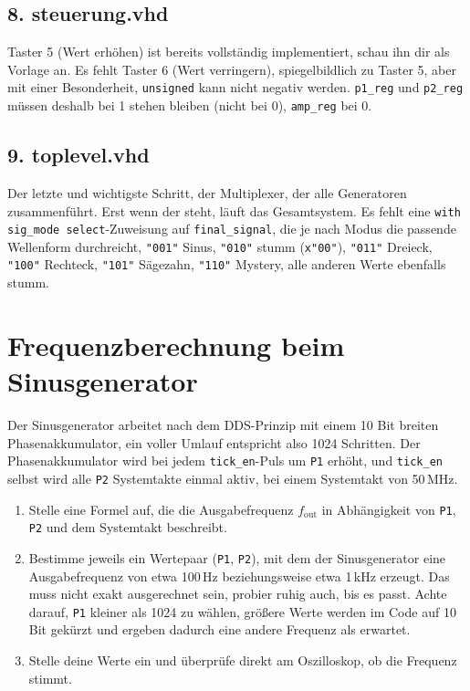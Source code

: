 \subsection*{8. steuerung.vhd}

Taster 5 (Wert erhöhen) ist bereits vollständig implementiert, schau ihn dir als Vorlage an. Es fehlt Taster 6 (Wert verringern), spiegelbildlich zu Taster 5, aber mit einer Besonderheit, \texttt{unsigned} kann nicht negativ werden. \texttt{p1\_reg} und \texttt{p2\_reg} müssen deshalb bei 1 stehen bleiben (nicht bei 0), \texttt{amp\_reg} bei 0.

\subsection*{9. toplevel.vhd}

Der letzte und wichtigste Schritt, der Multiplexer, der alle Generatoren zusammenführt. Erst wenn der steht, läuft das Gesamtsystem. Es fehlt eine \texttt{with sig\_mode select}-Zuweisung auf \texttt{final\_signal}, die je nach Modus die passende Wellenform durchreicht, \texttt{"001"} Sinus, \texttt{"010"} stumm (\texttt{x"00"}), \texttt{"011"} Dreieck, \texttt{"100"} Rechteck, \texttt{"101"} Sägezahn, \texttt{"110"} Mystery, alle anderen Werte ebenfalls stumm.

\section{Frequenzberechnung beim Sinusgenerator}
\label{sec:frequenzberechnung}

Der Sinusgenerator arbeitet nach dem DDS-Prinzip mit einem 10 Bit breiten Phasenakkumulator, ein voller Umlauf entspricht also 1024 Schritten. Der Phasenakkumulator wird bei jedem \texttt{tick\_en}-Puls um \texttt{P1} erhöht, und \texttt{tick\_en} selbst wird alle \texttt{P2} Systemtakte einmal aktiv, bei einem Systemtakt von 50\,MHz.

\begin{enumerate}
    \item Stelle eine Formel auf, die die Ausgabefrequenz $f_{\text{out}}$ in Abhängigkeit von \texttt{P1}, \texttt{P2} und dem Systemtakt beschreibt.
    \item Bestimme jeweils ein Wertepaar (\texttt{P1}, \texttt{P2}), mit dem der Sinusgenerator eine Ausgabefrequenz von etwa 100\,Hz beziehungsweise etwa 1\,kHz erzeugt. Das muss nicht exakt ausgerechnet sein, probier ruhig auch, bis es passt. Achte darauf, \texttt{P1} kleiner als 1024 zu wählen, größere Werte werden im Code auf 10 Bit gekürzt und ergeben dadurch eine andere Frequenz als erwartet.
    \item Stelle deine Werte ein und überprüfe direkt am Oszilloskop, ob die Frequenz stimmt.
\end{enumerate}

